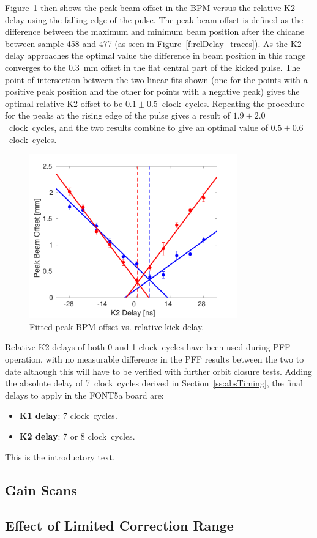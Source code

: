 Figure~\ref{f:relDelay_fit} then shows the peak beam offset in the BPM versus the relative K2 delay using the falling edge of the pulse. The peak beam offset is defined as the difference between the maximum and minimum beam position after the chicane between sample 458 and 477 (as seen in Figure~\ref{f:relDelay_traces}). As the K2 delay approaches the optimal value the difference in beam position in this range converges to the 0.3~mm offset in the flat central part of the kicked pulse. The point of intersection between the two linear fits shown (one for the points with a positive peak position and the other for points with a negative peak) gives the optimal relative K2 offset to be \(0.1\pm0.5\)~clock~cycles. Repeating the procedure for the peaks at the rising edge of the pulse gives a result of \(1.9\pm2.0\)~clock~cycles, and the two results combine to give an optimal value of \(0.5\pm0.6\)~clock~cycles.

\begin{figure}
  \centering
  \includegraphics[width=0.8\textwidth]{Figures/commissioning/relDelay_fit}
  \caption{Fitted peak BPM offset vs. relative kick delay.}
  \label{f:relDelay_fit}
\end{figure}

Relative K2 delays of both 0 and 1 clock~cycles have been used during PFF operation, with no measurable difference in the PFF results between the two to date although this will have to be verified with further orbit closure tests. Adding the absolute delay of 7~clock~cycles derived in Section~\ref{ss:absTiming}, the final delays to apply in the FONT5a board are:
\begin{itemize}
\item \textbf{K1 delay}: 7 clock~cycles.
\item \textbf{K2 delay}: 7 or 8 clock~cycles.
\end{itemize}


This is the introductory text.

\subsection{Gain Scans}
\label{ss:gainScans}

\subsection{Effect of Limited Correction Range}
\label{ss:effectLimRange}

